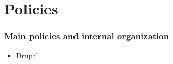 \section{Policies}

% 
\begin{frame}[allowframebreaks]
\frametitle{Main policies and internal organization}

    \begin{itemize}
	    \item Drupal
	\end{itemize}
\end{frame}
